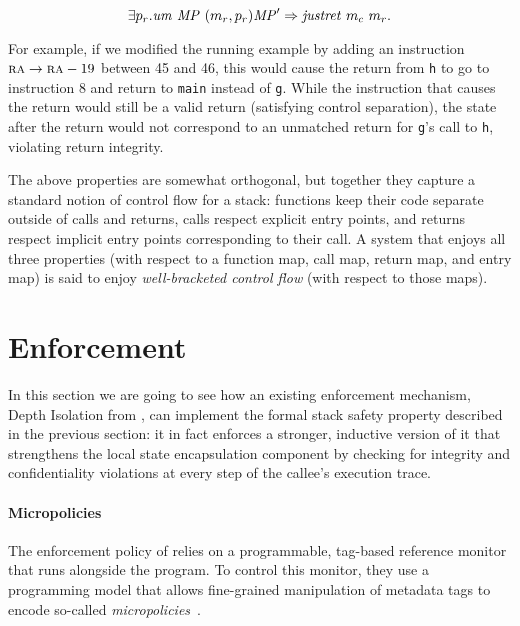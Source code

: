 \documentclass[acmsmall,review,anonymous]{acmart}\settopmatter{printfolios=true,printccs=false,printacmref=false}
\begin{document}
\[
\exists p_r.\mathit{um} ~ \mathit{MP} ~ (m_r,p_r)\mathit{MP}' \Rightarrow \mathit{justret}\ m_c\ m_r.
\]

For example, if we modified the running example by adding
an instruction $ \textsc{ra} \rightarrow \textsc{ra} - 19$
between 45 and 46, this would cause the return from {\tt h} to go to instruction 8 and
return to {\tt main} instead of {\tt g}. While the instruction that
causes the return would still be a valid return (satisfying control
separation), the state after the return would not correspond to an
unmatched return for {\tt g}'s call to {\tt h}, violating return
integrity.


The above properties are somewhat orthogonal, but together they
capture a standard notion of control flow for a stack: functions keep
their code separate outside of calls and returns, calls respect
explicit entry points, and returns respect implicit entry points
corresponding to their call.  A system that enjoys all three
properties (with respect to a function map, call map, return map,
and entry map) is said to enjoy
{\em well-bracketed control flow} (with respect to those maps).


\section{Enforcement}
\label{sec:enforcement}


In this section we are going to see how an existing enforcement mechanism,
Depth Isolation from \citet{DBLP:conf/sp/RoesslerD18}, can implement
the formal stack safety property described in the previous section: it in
fact enforces a stronger, inductive version of it that strengthens the
local state encapsulation component by checking for integrity and
confidentiality violations at every step of the callee's execution trace.

\paragraph*{Micropolicies}
%
The enforcement policy of \citeauthor{DBLP:conf/sp/RoesslerD18} relies
on a programmable, tag-based reference monitor that runs alongside the
program.  To control this monitor, they use a programming model that
allows fine-grained manipulation of metadata tags to encode so-called
\emph{micropolicies}~\citep{pump_oakland15}.
\end{document}
